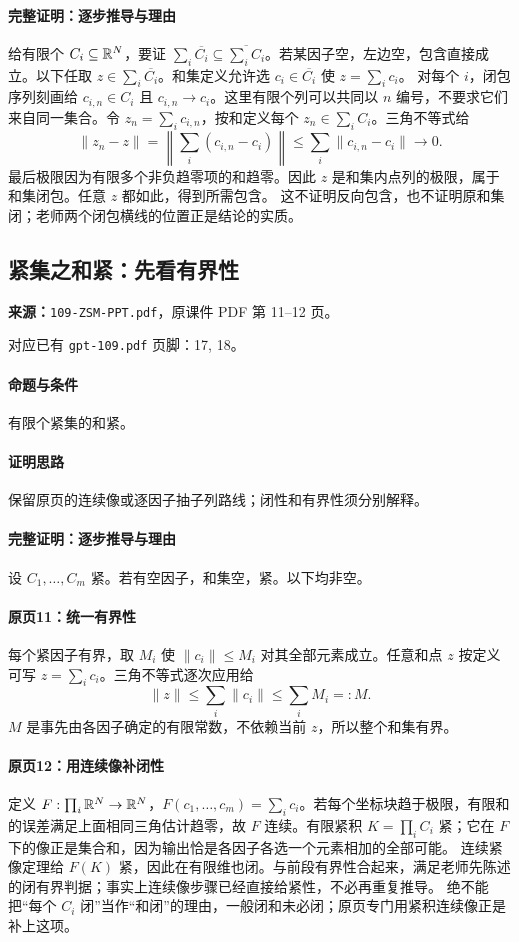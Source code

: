 \paragraph{完整证明：逐步推导与理由}

给有限个 $C_i\subseteq\mathbb{R}^N$，要证 $\sum_i\overline{C_i}\subseteq\overline{\sum_iC_i}$。若某因子空，左边空，包含直接成立。以下任取 $z\in\sum_i\overline{C_i}$。和集定义允许选 $c_i\in\overline{C_i}$ 使 $z=\sum_i c_i$。
对每个 $i$，闭包序列刻画给 $c_{i,n}\in C_i$ 且 $c_{i,n}\to c_i$。这里有限个列可以共同以 $n$ 编号，不要求它们来自同一集合。令 $z_n=\sum_i c_{i,n}$，按和定义每个 $z_n\in\sum_i C_i$。三角不等式给
\[\|z_n-z\|=\left\|\sum_i(c_{i,n}-c_i)\right\|\le\sum_i\|c_{i,n}-c_i\|\to0.\]
最后极限因为有限多个非负趋零项的和趋零。因此 $z$ 是和集内点列的极限，属于和集闭包。任意 $z$ 都如此，得到所需包含。
这不证明反向包含，也不证明原和集闭；老师两个闭包横线的位置正是结论的实质。

\clearpage\subsection{紧集之和紧：先看有界性}
\textbf{来源：}\texttt{109-ZSM-PPT.pdf}，原课件 PDF 第 11--12 页。\par
对应已有 \texttt{gpt-109.pdf} 页脚：17, 18。\par
\paragraph{命题与条件}有限个紧集的和紧。
\paragraph{证明思路}保留原页的连续像或逐因子抽子列路线；闭性和有界性须分别解释。
\paragraph{完整证明：逐步推导与理由}

设 $C_1,\ldots,C_m$ 紧。若有空因子，和集空，紧。以下均非空。
\paragraph{原页11：统一有界性}
每个紧因子有界，取 $M_i$ 使 $\|c_i\|\le M_i$ 对其全部元素成立。任意和点 $z$ 按定义可写 $z=\sum_i c_i$。三角不等式逐次应用给
\[\|z\|\le\sum_i\|c_i\|\le\sum_iM_i=:M.\]
$M$ 是事先由各因子确定的有限常数，不依赖当前 $z$，所以整个和集有界。
\paragraph{原页12：用连续像补闭性}
定义 $F:\prod_i\mathbb{R}^N\to\mathbb{R}^N$，$F(c_1,\ldots,c_m)=\sum_i c_i$。若每个坐标块趋于极限，有限和的误差满足上面相同三角估计趋零，故 $F$ 连续。有限紧积 $K=\prod_iC_i$ 紧；它在 $F$ 下的像正是集合和，因为输出恰是各因子各选一个元素相加的全部可能。
连续紧像定理给 $F(K)$ 紧，因此在有限维也闭。与前段有界性合起来，满足老师先陈述的闭有界判据；事实上连续像步骤已经直接给紧性，不必再重复推导。
绝不能把“每个 $C_i$ 闭”当作“和闭”的理由，一般闭和未必闭；原页专门用紧积连续像正是补上这项。

